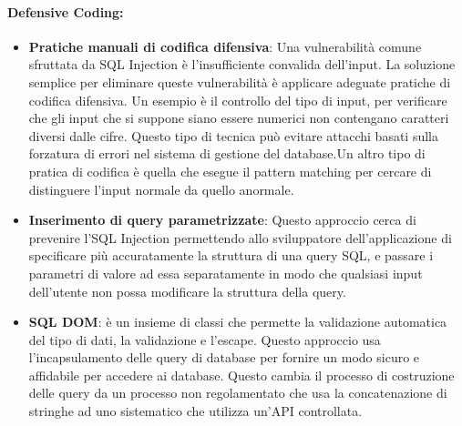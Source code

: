 \paragraph{Defensive Coding:}
\begin{itemize}
    \item \textbf{Pratiche manuali di codifica difensiva}: Una vulnerabilità
          comune sfruttata da SQL Injection è l'insufficiente convalida
          dell'input. La soluzione semplice per eliminare queste vulnerabilità
          è applicare adeguate pratiche di codifica difensiva. Un esempio è il
          controllo del tipo di input, per verificare che gli input che si
          suppone siano essere numerici non contengano caratteri diversi dalle
          cifre. Questo tipo di tecnica può evitare attacchi basati sulla
          forzatura di errori nel sistema di gestione del database.Un altro
          tipo di pratica di codifica è quella che esegue il pattern matching
          per cercare di distinguere l'input normale da quello anormale.
    \item \textbf{Inserimento di query parametrizzate}: Questo approccio cerca
          di prevenire l'SQL Injection permettendo allo sviluppatore
          dell'applicazione di specificare più accuratamente la struttura di
          una query SQL, e passare i parametri di valore ad essa separatamente
          in modo che qualsiasi input dell'utente non possa
          modificare la struttura della query.
    \item \textbf{SQL DOM}: è un insieme di classi che permette la
          validazione automatica del tipo di dati, la validazione e l'escape.
          Questo approccio usa l'incapsulamento delle query di database per
          fornire un modo sicuro e affidabile per accedere ai database. Questo
          cambia il processo di costruzione delle query da un processo non
          regolamentato che usa la concatenazione di stringhe ad uno
          sistematico che utilizza un'API controllata.
\end{itemize}

